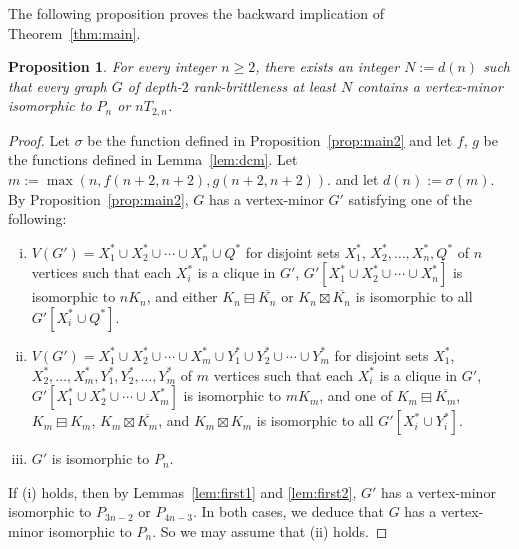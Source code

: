 \documentclass[11pt]{article}
\newtheorem{proposition}[theorem]{Proposition}
\newcommand\mat{\boxminus}
\newcommand\antimat{\boxtimes}
\def\S_#1{\overline{K_{#1}}}
\begin{document}
      The following proposition proves the backward implication
      of Theorem~\ref{thm:main}.
        \begin{proposition}\label{prop:mainprop}
          For every integer $n\ge 2$, there exists an integer $N:=d(n)$ such that 
          every graph $G$ of depth-$2$ rank-brittleness at least  $N$ contains a vertex-minor isomorphic to $P_n$ or $nT_{2,n}$.
        \end{proposition}
        \begin{proof}
          Let $\sigma$ be the function defined in Proposition~\ref{prop:main2}
          and let $f$, $g$ be the functions defined in Lemma~\ref{lem:dcm}.
          Let $m:=\max(n, f(n+2,n+2),g(n+2,n+2))$.
          and let $d(n):=\sigma(m)$.
          By Proposition~\ref{prop:main2},
          $G$ has a vertex-minor $G'$ satisfying one of the following:
                \begin{enumerate}[(i)]
                \item $V(G')=X_1^*\cup X_2^*\cup\cdots \cup X_n^*\cup Q^*$
                  for disjoint sets $X_1^*$, $X_2^*,\ldots, X_n^*,Q^*$ of $n$ vertices
                  such
                  that each $X_i^*$ is a clique in $G'$,
                  $G'[X_1^*\cup X_2^*\cup \cdots \cup X_n^*]$ is isomorphic to $nK_n$,
                  and
                  either $K_n\mat \S_n$ or $K_n\antimat \S_n$
                  is isomorphic to all $G'[X_i^*\cup Q^*]$.
                \item $V(G')=X_1^*\cup X_2^*\cup\cdots \cup X_m^*\cup Y_1^*
                  \cup Y_2^*\cup\cdots\cup Y_m^*$
                  for disjoint sets $X_1^*$, $X_2^*,\ldots, X_m^*,Y_1^*,Y_2^*,\ldots,
                  Y_m^*$ of $m$ vertices
                  such
                  that each $X_i^*$ is a clique in $G'$,
                  $G'[X_1^*\cup X_2^*\cup \cdots \cup X_m^*]$ is isomorphic to $m K_m$,
                  and
                  one of  $K_m\mat \S_m$,
                  $K_m\mat K_m$,  $K_m\antimat \S_m$, 
                  and $K_m\antimat K_m$
                  is isomorphic to 
                  all $G'[X_i^*\cup Y_i^*]$.
                \item $G'$ is isomorphic to $P_n$.
                \end{enumerate}
                If (i) holds, then by Lemmas~\ref{lem:first1} and \ref{lem:first2}, $G'$ has a 
                vertex-minor isomorphic to $P_{3n-2}$ or $P_{4n-3}$.  In both cases, we deduce that 
                $G$ has a vertex-minor isomorphic to $P_n$.
                So we may assume that (ii) holds.

\end{proof}
\end{document}
